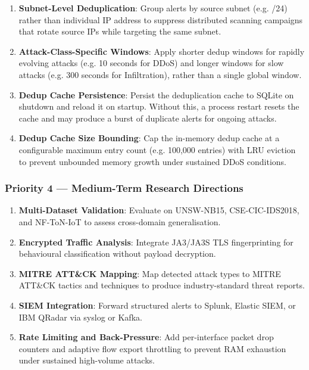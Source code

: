 \documentclass[12pt,a4paper]{article}
\begin{document}
\begin{enumerate}
    \item \textbf{Subnet-Level Deduplication}: Group alerts by source subnet (e.g. /24) rather than individual IP address to suppress distributed scanning campaigns that rotate source IPs while targeting the same subnet.

    \item \textbf{Attack-Class-Specific Windows}: Apply shorter dedup windows for rapidly evolving attacks (e.g. 10 seconds for DDoS) and longer windows for slow attacks (e.g. 300 seconds for Infiltration), rather than a single global window.

    \item \textbf{Dedup Cache Persistence}: Persist the deduplication cache to SQLite on shutdown and reload it on startup. Without this, a process restart resets the cache and may produce a burst of duplicate alerts for ongoing attacks.

    \item \textbf{Dedup Cache Size Bounding}: Cap the in-memory dedup cache at a configurable maximum entry count (e.g. 100,000 entries) with LRU eviction to prevent unbounded memory growth under sustained DDoS conditions.
\end{enumerate}

\subsubsection{Priority 4 — Medium-Term Research Directions}

\begin{enumerate}
    \item \textbf{Multi-Dataset Validation}: Evaluate on UNSW-NB15, CSE-CIC-IDS2018, and NF-ToN-IoT to assess cross-domain generalisation.
    \item \textbf{Encrypted Traffic Analysis}: Integrate JA3/JA3S TLS fingerprinting for behavioural classification without payload decryption.
    \item \textbf{MITRE ATT\&CK Mapping}: Map detected attack types to MITRE ATT\&CK tactics and techniques to produce industry-standard threat reports.
    \item \textbf{SIEM Integration}: Forward structured alerts to Splunk, Elastic SIEM, or IBM QRadar via syslog or Kafka.
    \item \textbf{Rate Limiting and Back-Pressure}: Add per-interface packet drop counters and adaptive flow export throttling to prevent RAM exhaustion under sustained high-volume attacks.
\end{enumerate}
\end{document}
